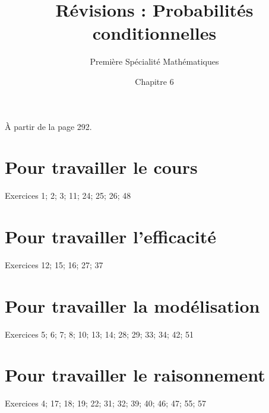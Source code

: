 \documentclass{exos}
\title{Révisions : Probabilités conditionnelles}
\author{Première Spécialité Mathématiques}
\date{Chapitre 6}
\begin{document}
\maketitle
À partir de la page 292.
\section{Pour travailler le cours}
Exercices 1; 2; 3; 11; 24; 25; 26; 48

\section{Pour travailler l'efficacité}
Exercices 12; 15; 16; 27; 37

\section{Pour travailler la modélisation}
Exercices 5; 6; 7; 8; 10; 13; 14; 28; 29; 33; 34; 42; 51

\section{Pour travailler le raisonnement}
Exercices 4; 17; 18; 19; 22; 31; 32; 39; 40; 46; 47; 55; 57
\end{document}
